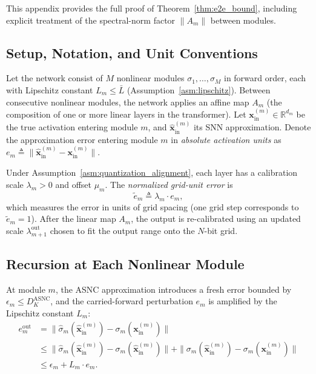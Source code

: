 \documentclass{article}
\theoremstyle{plain}
\theoremstyle{definition}
\theoremstyle{remark}
\begin{document}
This appendix provides the full proof of Theorem~\ref{thm:e2e_bound},
including explicit treatment of the spectral-norm factor $\|A_m\|$ between
modules.

\subsection{Setup, Notation, and Unit Conventions}
\label{app:e2e_setup}

Let the network consist of $M$ nonlinear modules $\sigma_1, \ldots, \sigma_M$
in forward order, each with Lipschitz constant $L_m \le \bar{L}$
(Assumption~\ref{asm:lipschitz}). Between consecutive nonlinear modules, the
network applies an affine map $A_m$ (the composition of one or more linear
layers in the transformer). Let
$\mathbf{x}^{(m)}_\mathrm{in} \in \mathbb{R}^{d_m}$ be the true activation
entering module $m$, and $\hat{\mathbf{x}}^{(m)}_\mathrm{in}$ its SNN
approximation. Denote the approximation error entering module $m$ in
\emph{absolute activation units} as
$e_m \triangleq \|\hat{\mathbf{x}}^{(m)}_\mathrm{in} - \mathbf{x}^{(m)}_\mathrm{in}\|$.

Under Assumption~\ref{asm:quantization_alignment}, each layer has a
calibration scale $\lambda_m > 0$ and offset $\mu_m$. The \emph{normalized
grid-unit error} is
\[
\tilde{e}_m \triangleq \lambda_m \cdot e_m,
\]
which measures the error in units of grid spacing (one grid step corresponds
to $\tilde{e}_m = 1$). After the linear map $A_m$, the output is re-calibrated
using an updated scale $\lambda_{m+1}^{\mathrm{out}}$ chosen to fit the output
range onto the $N$-bit grid.

\subsection{Recursion at Each Nonlinear Module}
\label{app:recursion}

At module $m$, the ASNC approximation introduces a fresh error bounded by
$\epsilon_m \le D_K^{\mathrm{ASNC}}$, and the carried-forward perturbation
$e_m$ is amplified by the Lipschitz constant $L_m$:
\begin{align}
e_m^\mathrm{out}
&= \|\hat{\sigma}_m(\hat{\mathbf{x}}^{(m)}_\mathrm{in})
      - \sigma_m(\mathbf{x}^{(m)}_\mathrm{in})\| \nonumber \\
&\le \|\hat{\sigma}_m(\hat{\mathbf{x}}^{(m)}_\mathrm{in})
      - \sigma_m(\hat{\mathbf{x}}^{(m)}_\mathrm{in})\|
    + \|\sigma_m(\hat{\mathbf{x}}^{(m)}_\mathrm{in})
      - \sigma_m(\mathbf{x}^{(m)}_\mathrm{in})\| \nonumber \\
&\le \epsilon_m + L_m \cdot e_m. \label{eq:module_recursion}
\end{align}
\end{document}
